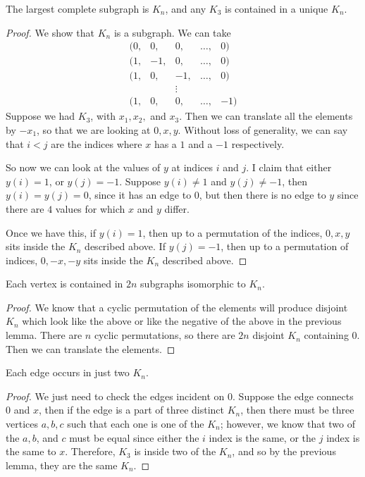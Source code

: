 \documentclass[runningheads,a4paper]{llncs}
\begin{document}
\begin{lemma}
The largest complete subgraph is $K_n$, and any $K_3$ is contained in a unique $K_n$.
\end{lemma}

\begin{proof}
We show that $K_n$ is a subgraph. We can take 
\[ \begin{array}{ccccc} (0, &0, &0, &\dots, &0) \\
			     (1, &-1, &0, &\dots, &0) \\
			     (1, &0, &-1, &\dots, &0) \\
				&&\vdots \\
			     (1, &0, &0, &\dots, &-1) \end{array} \]
Suppose we had $K_3$, with $x_1, x_2,$ and $x_3$. Then we can translate all the elements by $-x_1$, so that we are looking at $0, x, y$. Without loss of generality, we can say that $i < j$ are the indices where $x$ has a $1$ and a $-1$ respectively. 

So now we can look at the values of $y$ at indices $i$ and $j$. I claim that either $y(i) = 1$, or $y(j) = -1$. Suppose $y(i) \neq 1$ and $y(j) \neq -1$, then $y(i) = y(j) = 0$, since it has an edge 
to $0$, but then there is no edge to $y$ since there are $4$ values for which $x$ and $y$ differ. 

Once we have this, if $y(i) = 1$, then up to a permutation of the indices, $0,x, y$ sits inside the $K_n$ described above. If $y(j) = -1$, then up to a permutation of indices, $0, -x, -y$ sits inside the $K_n$ described above.
\end{proof}

\begin{lemma}
Each vertex is contained in $2n$ subgraphs isomorphic to $K_n$. 
\end{lemma}

\begin{proof}
We know that a cyclic permutation of the elements will produce disjoint $K_n$ which look like the above or like the negative of the above in the previous lemma. There are $n$ cyclic permutations, so there are $2n$ disjoint $K_n$ containing $0$. Then we can translate the elements.
\end{proof}

\begin{lemma}
Each edge occurs in just two $K_n$.
\end{lemma}

\begin{proof}
We just need to check the edges incident on 0. Suppose the edge connects $0$ and $x$, then if the edge is a part of three distinct $K_n$, then there must be three vertices $a, b, c$ such that each one is one of the $K_n$; however, we know that two of the $a, b$, and $c$ must be equal since either the $i$ index is the same, or the $j$ index is the same to $x$. Therefore, $K_3$ is inside two of the $K_n$, and so by the previous lemma, they are the same $K_n$. 
\end{proof}
\end{document}
